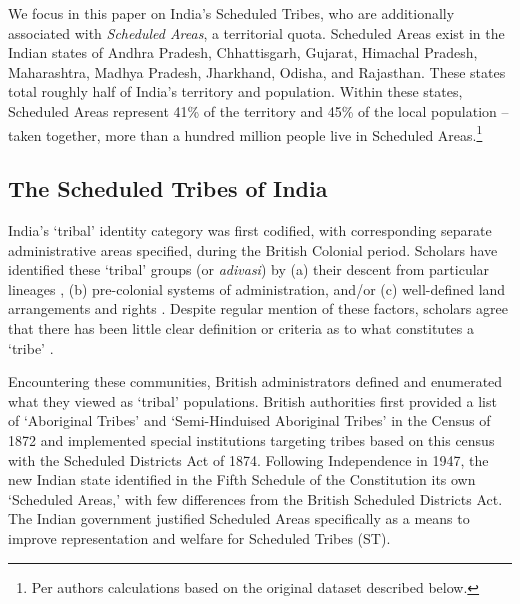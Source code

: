 \documentclass[12pt,reqno]{article}
\begin{document}



We focus in this paper on India's Scheduled Tribes, who are additionally associated with \emph{Scheduled Areas}, a territorial quota. Scheduled Areas exist in the Indian states of Andhra Pradesh, Chhattisgarh, Gujarat, Himachal Pradesh, Maharashtra, Madhya Pradesh, Jharkhand, Odisha, and Rajasthan. These states total roughly half of India's territory and population. Within these states, Scheduled Areas represent 41\% of the territory and 45\% of the local population -- taken together, more than a hundred million people live in Scheduled Areas.\footnote{Per authors calculations based on the original dataset described below.}

\subsection{The Scheduled Tribes of India}

India's `tribal' identity category was first codified, with corresponding separate administrative areas specified, during the British Colonial period. Scholars have identified these  `tribal' groups (or {\it adivasi}) by (a) their descent from particular lineages \parencite{Sundar2009b}, (b) pre-colonial systems of administration, and/or (c) well-defined land arrangements and rights \parencite{DasGupta2011a, DasGupta2011b}. Despite regular mention of these factors, scholars agree that there has been little clear definition or criteria as to what constitutes a `tribe' \parencite{Beteille1974, Beteille1986, Dhebar, Corbridge, Corbridge2002, Galanter}.

Encountering these communities, British administrators defined and enumerated what they viewed as `tribal' populations. British authorities first provided a list of `Aboriginal Tribes' and `Semi-Hinduised Aboriginal Tribes' in the Census of 1872 \parencite[64]{Corbridge2002} and implemented special institutions targeting tribes based on this census with the Scheduled Districts Act of 1874. Following Independence in 1947, the new Indian state identified in the Fifth Schedule of the Constitution its own `Scheduled Areas,' with few differences from the British Scheduled Districts Act. The Indian government justified Scheduled Areas specifically as a means to improve representation and welfare for Scheduled Tribes (ST).
\end{document}
